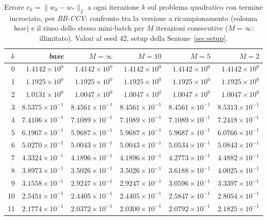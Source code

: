 \begin{table}[H]
\centering
\footnotesize
\renewcommand{\arraystretch}{0.85}
\setlength{\tabcolsep}{4pt}
\caption{Errore $e_k=\|w_k-w_*\|_2$ a ogni iterazione $k$ sul problema quadratico con termine incrociato, per \emph{BB-CCV}: confronto tra la versione a ricampionamento (colonna \emph{base}) e il riuso dello stesso mini-batch per $M$ iterazioni consecutive ($M=\infty$: illimitato). Valori al seed 42, setup della Sezione~\ref{sec:setup}.}
\label{tab:riuso_offdiag_bb}
\begin{tabular}{@{}rrrrrr@{}}
\toprule
$k$ & \emph{base} & $M{=}\infty$ & $M{=}10$ & $M{=}5$ & $M{=}2$\\
\midrule
0 & $1.4142\times10^{0}$ & $1.4142\times10^{0}$ & $1.4142\times10^{0}$ & $1.4142\times10^{0}$ & $1.4142\times10^{0}$\\
1 & $1.1925\times10^{0}$ & $1.1925\times10^{0}$ & $1.1925\times10^{0}$ & $1.1925\times10^{0}$ & $1.1925\times10^{0}$\\
2 & $1.0131\times10^{0}$ & $1.0047\times10^{0}$ & $1.0047\times10^{0}$ & $1.0047\times10^{0}$ & $1.0047\times10^{0}$\\
3 & $8.5375\times10^{-1}$ & $8.4561\times10^{-1}$ & $8.4561\times10^{-1}$ & $8.4561\times10^{-1}$ & $8.5313\times10^{-1}$\\
4 & $7.4106\times10^{-1}$ & $7.1089\times10^{-1}$ & $7.1089\times10^{-1}$ & $7.1089\times10^{-1}$ & $7.2418\times10^{-1}$\\
5 & $6.1967\times10^{-1}$ & $5.9687\times10^{-1}$ & $5.9687\times10^{-1}$ & $5.9687\times10^{-1}$ & $6.0766\times10^{-1}$\\
6 & $5.0270\times10^{-1}$ & $5.0043\times10^{-1}$ & $5.0043\times10^{-1}$ & $5.0534\times10^{-1}$ & $5.0843\times10^{-1}$\\
7 & $4.3324\times10^{-1}$ & $4.1896\times10^{-1}$ & $4.1896\times10^{-1}$ & $4.2773\times10^{-1}$ & $4.4882\times10^{-1}$\\
8 & $3.8973\times10^{-1}$ & $3.5026\times10^{-1}$ & $3.5026\times10^{-1}$ & $3.6188\times10^{-1}$ & $4.0025\times10^{-1}$\\
9 & $3.1558\times10^{-1}$ & $2.9247\times10^{-1}$ & $2.9247\times10^{-1}$ & $3.0596\times10^{-1}$ & $3.3397\times10^{-1}$\\
10 & $2.5451\times10^{-1}$ & $2.4405\times10^{-1}$ & $2.4405\times10^{-1}$ & $2.5847\times10^{-1}$ & $2.8054\times10^{-1}$\\
11 & $2.1774\times10^{-1}$ & $2.0372\times10^{-1}$ & $2.0300\times10^{-1}$ & $2.0792\times10^{-1}$ & $2.1825\times10^{-1}$\\

\end{tabular}
\end{table}
